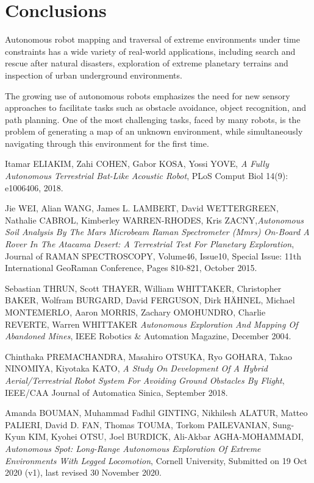 \documentclass[12pt, twoside]{article}
\begin{document}
\section{Conclusions}
Autonomous robot mapping and traversal of extreme environments under time constraints has a wide variety of real-world applications, including search and rescue after natural disasters, exploration of extreme planetary terrains and inspection of urban underground environments.

The growing use of autonomous robots emphasizes the need for new sensory approaches to facilitate tasks such as obstacle avoidance, object recognition, and path planning. One of the most challenging tasks, faced by many robots, is the problem of generating a map of an unknown environment, while simultaneously navigating through this environment for the first time.


\begin{thebibliography}{24}

	Itamar \uppercase{Eliakim}, Zahi \uppercase{Cohen}, Gabor \uppercase{Kosa}, Yossi \uppercase{Yove}, \textit{A Fully Autonomous Terrestrial Bat-Like Acoustic Robot}, PLoS Comput Biol 14(9): e1006406, 2018.

	Jie \uppercase{Wei}, Alian \uppercase{Wang}, James L. \uppercase{Lambert}, David \uppercase{Wettergreen}, Nathalie \uppercase{Cabrol}, Kimberley \uppercase{Warren-Rhodes}, Kris \uppercase{Zacny},\textit{Autonomous Soil Analysis By The Mars Microbeam Raman Spectrometer (Mmrs) On-Board A Rover In The Atacama Desert: A Terrestrial Test For Planetary Exploration}, Journal of RAMAN SPECTROSCOPY, Volume46, Issue10, Special Issue: 11th International GeoRaman Conference, Pages 810-821, October 2015.

 Sebastian \uppercase{Thrun}, Scott \uppercase{Thayer}, William \uppercase{Whittaker}, Christopher \uppercase{Baker}, Wolfram \uppercase{Burgard}, David \uppercase{Ferguson}, Dirk \uppercase{Hähnel}, Michael \uppercase{Montemerlo}, Aaron \uppercase{Morris}, Zachary \uppercase{Omohundro}, Charlie \uppercase{Reverte}, Warren \uppercase{Whittaker} \textit{Autonomous Exploration And Mapping Of Abandoned Mines}, IEEE Robotics \& Automation Magazine, December 2004.

	Chinthaka  \uppercase{Premachandra}, Masahiro \uppercase{Otsuka}, Ryo \uppercase{Gohara}, Takao \uppercase{Ninomiya}, Kiyotaka \uppercase{Kato}, \textit{A Study On Development Of A Hybrid Aerial/Terrestrial Robot System For Avoiding Ground Obstacles By Flight}, IEEE/CAA Journal of Automatica Sinica, September 2018.

	Amanda  \uppercase{Bouman}, Muhammad Fadhil \uppercase{Ginting}, Nikhilesh \uppercase{Alatur}, Matteo  \uppercase{Palieri}, David D. \uppercase{Fan}, Thomas  \uppercase{Touma}, Torkom \uppercase{Pailevanian}, Sung-Kyun \uppercase{Kim}, Kyohei \uppercase{Otsu}, Joel \uppercase{Burdick}, Ali-Akbar \uppercase{Agha-Mohammadi}, \textit{Autonomous Spot: Long-Range Autonomous Exploration Of Extreme Environments With Legged Locomotion}, Cornell University, Submitted on 19 Oct 2020 (v1), last revised 30 November 2020.


\end{thebibliography}
\end{document}

